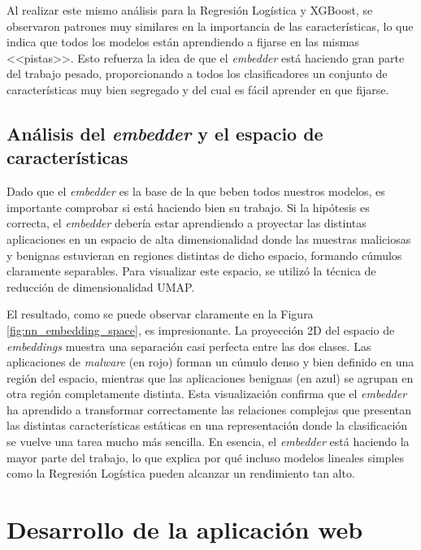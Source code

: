 Al realizar este mismo análisis para la Regresión Logística y XGBoost, se observaron patrones muy similares en la importancia de las características, lo que indica que todos los modelos están aprendiendo a fijarse en las mismas <<pistas>>. Esto refuerza la idea de que el \textit{embedder} está haciendo gran parte del trabajo pesado, proporcionando a todos los clasificadores un conjunto de características muy bien segregado y del cual es fácil aprender en que fijarse.

\subsection{Análisis del \textit{embedder} y el espacio de características}

Dado que el \textit{embedder} es la base de la que beben todos nuestros modelos, es importante comprobar si está haciendo bien su trabajo. Si la hipótesis es correcta, el \textit{embedder} debería estar aprendiendo a proyectar las distintas aplicaciones en un espacio de alta dimensionalidad donde las muestras maliciosas y benignas estuvieran en regiones distintas de dicho espacio, formando cúmulos claramente separables. Para visualizar este espacio, se utilizó la técnica de reducción de dimensionalidad UMAP.


El resultado, como se puede observar claramente en la Figura \ref{fig:nn_embedding_space}, es impresionante. La proyección 2D del espacio de \textit{embeddings} muestra una separación casi perfecta entre las dos clases. Las aplicaciones de \textit{malware} (en rojo) forman un cúmulo denso y bien definido en una región del espacio, mientras que las aplicaciones benignas (en azul) se agrupan en otra región completamente distinta. Esta visualización confirma que el \textit{embedder} ha aprendido a transformar correctamente las relaciones complejas que presentan las distintas características estáticas en una representación donde la clasificación se vuelve una tarea mucho más sencilla. En esencia, el \textit{embedder} está haciendo la mayor parte del trabajo, lo que explica por qué incluso modelos lineales simples como la Regresión Logística pueden alcanzar un rendimiento tan alto.

\section{Desarrollo de la aplicación web}

